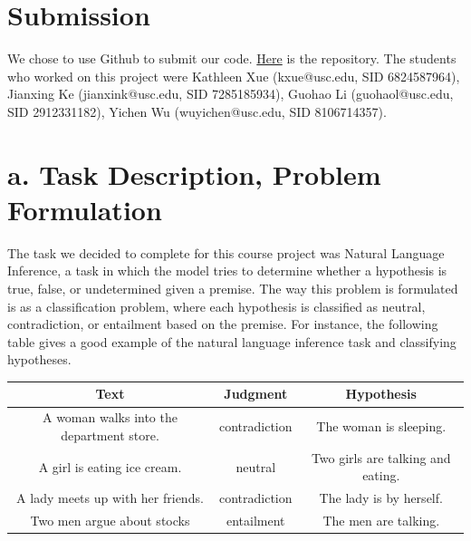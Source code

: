 \documentclass[12pt,letterpaper]{article}
\begin{document}
\section*{Submission} We chose to use Github to submit our code. \href{https://github.com/kathleen-xue/csci544project}{Here} is the repository. The students who worked on this project were Kathleen Xue (kxue@usc.edu, SID 6824587964), Jianxing Ke (jianxink@usc.edu, SID 7285185934), Guohao Li (guohaol@usc.edu, SID 2912331182), Yichen Wu (wuyichen@usc.edu, SID 8106714357). 
\section*{a. Task Description, Problem Formulation}
The task we decided to complete for this course project was Natural Language Inference, a task in which the model tries to determine whether a hypothesis is true, false, or undetermined given a premise. The way this problem is formulated is as a classification problem, where each hypothesis is classified as neutral, contradiction, or entailment based on the premise. For instance, the following table gives a good example of the natural language inference task and classifying hypotheses.
\begin{center}
    \begin{tabular}{| c | c | c |}
        \hline
        \textbf{Text} & \textbf{Judgment} & \textbf{Hypothesis} \\ \hline
        A woman walks into the department store. & contradiction & The woman is sleeping.
        \\ \hline
        A girl is eating ice cream. & neutral & Two girls are talking and eating. \\ \hline
        A lady meets up with her friends. & contradiction & The lady is by herself. \\ \hline
        Two men argue about stocks & entailment & The men are talking. \\ \hline
    \end{tabular}
\end{center}
\end{document}
